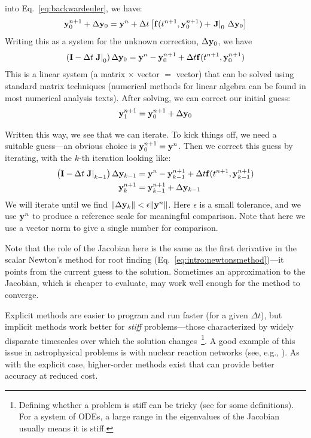into Eq.~\ref{eq:backwardeuler}, we have:
\begin{equation}
{\bf y}^{n+1}_0 + \Delta {\bf y}_0 = {\bf y}^n + \Delta t \left [
  {\bf f}(t^{n+1}, {\bf y}^{n+1}_0) +
     \left .{\bf J}\right |_0\, \Delta {\bf y}_0 \right ]
\end{equation}
Writing this as a system for the unknown correction, $\Delta {\bf
  y}_0$, we have
\begin{equation}
  \left ({\bf I} - \Delta t \left . {\bf J} \right |_0 \right ) \Delta {\bf y}_0 =
   {\bf y}^n - {\bf y}_0^{n+1} + \Delta t {\bf f}(t^{n+1}, {\bf y}^{n+1}_0)
\end{equation}
This is a linear system (a matrix $\times$ vector $=$ vector) that can
be solved using standard matrix techniques (numerical methods for
linear algebra can be found in most numerical analysis texts).  After
solving, we can correct our initial guess:
\begin{equation}
  {\bf y}^{n+1}_1 = {\bf y}^{n+1}_0 + \Delta {\bf y}_0
\end{equation}

Written this way, we see that we can iterate.  To kick things off, we
need a suitable guess---an obvious choice is ${\bf y}^{n+1}_0 = {\bf
  y}^n$.  Then we correct this guess by iterating, with the $k$-th
iteration looking like:
\begin{align}
  \left ({\bf I} - \Delta t \left . {\bf J} \right |_{k-1} \right ) \Delta {\bf y}_{k-1} &=
        {\bf y}^n - {\bf y}_{k-1}^{n+1} + \Delta t {\bf f}(t^{n+1}, {\bf y}^{n+1}_{k-1}) \\
  {\bf y}^{n+1}_k &= {\bf y}^{n+1}_{k-1} + \Delta {\bf y}_{k-1}
\end{align}
We will iterate until we find $\| \Delta {\bf y}_k\| < \epsilon \|
{\bf y}^n \|$.  Here $\epsilon$ is a small tolerance, and we use ${\bf
  y}^n$ to produce a reference scale for meaningful comparison.  Note
that here we use a vector norm to give a single number for comparison.

Note that the role of the Jacobian here is the same as the first
derivative in the scalar Newton's method for root finding
(Eq.~\ref{eq:intro:newtonsmethod})---it points from the current guess
to the solution.  Sometimes an approximation to the Jacobian, which is
cheaper to evaluate, may work well enough for the method to converge.

Explicit methods are easier to program and run faster (for a given $
\Delta t$), but implicit methods work better for {\em stiff}
problems---those characterized by widely disparate timescales over
which the solution changes~\cite{byrnehindmarsh}\footnote{Defining
  whether a problem is stiff can be tricky (see \cite{byrnehindmarsh}
  for some definitions).  For a system of ODEs, a large range in the
  eigenvalues of the Jacobian usually means it is stiff.}.  A good
example of this issue in astrophysical problems is with nuclear
reaction networks (see, e.g., \cite{timmes_networks}).  As with the
explicit case, higher-order methods exist that can provide better
accuracy at reduced cost.



